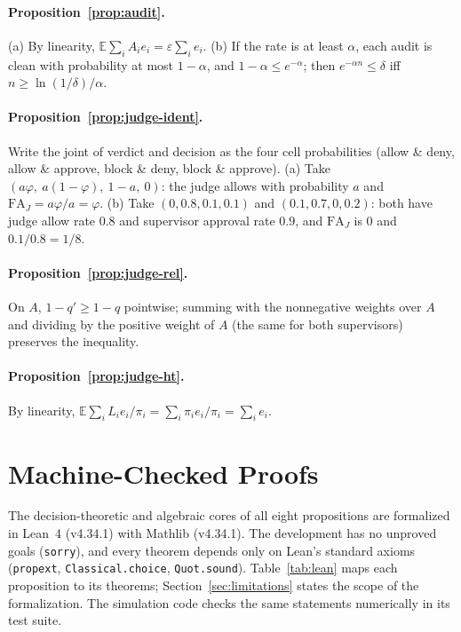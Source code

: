 \documentclass[11pt]{article}
\begin{document}
\paragraph{Proposition~\ref{prop:audit}.} (a) By linearity,
$\mathbb E\sum_i A_i e_i = \varepsilon \sum_i e_i$. (b) If the rate is at
least $\alpha$, each audit is clean with probability at most $1 - \alpha$, and
$1 - \alpha \le e^{-\alpha}$; then $e^{-\alpha n} \le \delta$ iff
$n \ge \ln(1/\delta)/\alpha$.

\paragraph{Proposition~\ref{prop:judge-ident}.} Write the joint of verdict and
decision as the four cell probabilities (allow \& deny, allow \& approve,
block \& deny, block \& approve). (a) Take $(a\varphi,\ a(1-\varphi),\ 1-a,\
0)$: the judge allows with probability $a$ and
$\mathrm{FA}_J = a\varphi/a = \varphi$. (b) Take $(0, 0.8, 0.1, 0.1)$ and
$(0.1, 0.7, 0, 0.2)$: both have judge allow rate $0.8$ and supervisor approval
rate $0.9$, and $\mathrm{FA}_J$ is $0$ and $0.1/0.8 = 1/8$.

\paragraph{Proposition~\ref{prop:judge-rel}.} On $A$, $1 - q' \ge 1 - q$
pointwise; summing with the nonnegative weights over $A$ and dividing by the
positive weight of $A$ (the same for both supervisors) preserves the
inequality.

\paragraph{Proposition~\ref{prop:judge-ht}.} By linearity,
$\mathbb E\sum_i L_i e_i/\pi_i = \sum_i \pi_i e_i/\pi_i = \sum_i e_i$.

\section{Machine-Checked Proofs}\label{app:lean}

The decision-theoretic and algebraic cores of all eight propositions are
formalized in Lean~4 (v4.34.1) with Mathlib (v4.34.1). The development has no
unproved goals (\texttt{sorry}), and every theorem depends only on Lean's
standard axioms (\texttt{propext}, \texttt{Classical.choice},
\texttt{Quot.sound}). Table~\ref{tab:lean} maps each proposition to its
theorems; Section~\ref{sec:limitations} states the scope of the
formalization. The simulation code checks the same statements numerically in
its test suite.
\end{document}
